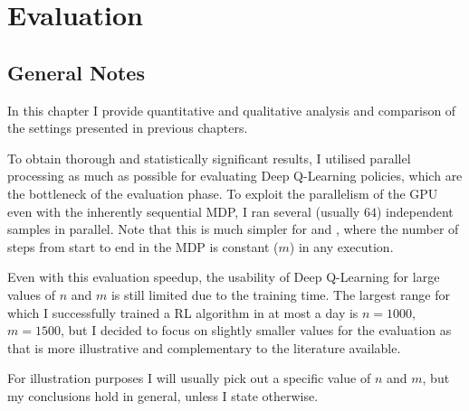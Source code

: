 \chapter{Evaluation}\label{evaluation}


\ifpdf
    \graphicspath{{Chapter3/Figs/Raster/}{Chapter3/Figs/PDF/}{Chapter3/Figs/}}
\else
    \graphicspath{{Chapter3/Figs/Vector/}{Chapter3/Figs/}}
\fi



\section{General Notes} \label{evaluationnotes}

In this chapter I provide quantitative and qualitative analysis and comparison of the settings presented in previous chapters.


To obtain thorough and statistically significant results, I utilised parallel processing as much as possible for evaluating Deep Q-Learning policies, which are the bottleneck of the evaluation phase. To exploit the parallelism of the GPU even with the inherently sequential MDP, I ran several (usually $64$) independent samples in parallel. Note that this is much simpler for \TwoThinning and \GraphicalTwoChoice, where the number of steps from start to end in the MDP is constant ($m$) in any execution.


Even with this evaluation speedup, the usability of Deep Q-Learning for large values of $n$ and $m$ is still limited due to the training time. The largest range for which I successfully trained a RL algorithm in at most a day is $n=1000$, $m=1500$, but I decided to focus on slightly smaller values for the evaluation as that is more illustrative and complementary to the literature available.


For illustration purposes I will usually pick out a specific value of $n$ and $m$, but my conclusions hold in general, unless I state otherwise.

